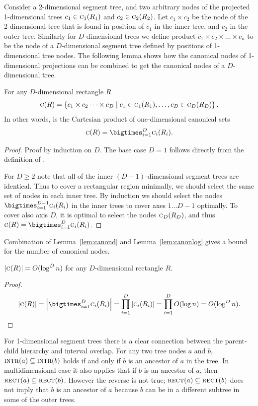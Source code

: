 \documentclass[english,gradu]{tktltiki2018}
\begin{document}
Consider a 2-dimensional segment tree, and two arbitrary nodes of the projected 1-dimensional trees $c_1\in\canoni{R_1}{1}$ and $c_2\in\canoni{R_2}{2}$.
Let $c_1\times c_2$ be the node of the 2-dimensional tree that is found in position of $c_1$ in the inner tree, and $c_2$ in the outer tree.
Similarly for $D$-dimensional trees we define product $c_1\times c_2\times\dots\times c_n$ to be the node of a $D$-dimensional segment tree defined by positions of 1-dimensional tree nodes.
The following lemma shows how the canonical nodes of 1-dimensional projections can be combined to get the canonical nodes of a $D$-dimensional tree.

\begin{lem}\label{lem:canond}
For any $D$-dimensional rectangle $R$
$$\canon{R}=\set{c_1\times c_2\dots\times c_D \mid c_1\in\canoni{R_1}{1}, \dots, c_D\in\canoni{R_D}{D}}.$$
In other words,  is the Cartesian product of one-dimensional canonical sets
$$\canon{R}=\bigtimes_{i=1}^D \canoni{R_i}{i}.$$
\end{lem}
\begin{proof}
Proof by induction on $D$.
The base case $D=1$ follows directly from the definition of .

For $D\ge 2$ note that all of the inner $(D-1)$-dimensional segment trees are identical.
Thus to cover a rectangular region minimally, we should select the same set of nodes in each inner tree.
By induction we should select the nodes $\bigtimes_{i=1}^{D-1} \canoni{R_i}{i}$ in the inner trees to cover axes $1\dots D-1$ optimally.
To cover also axis $D$, it is optimal to select the nodes $\canoni{R_D}{D}$, and thus $\canon{R}=\bigtimes_{i=1}^D\canoni{R_i}{i}$.
\end{proof}

Combination of Lemma~\ref{lem:canond} and Lemma~\ref{lem:canonlog} gives a bound for the number of canonical nodes.

\begin{cor}\label{cor:canondcount}$\size{\canon{R}}=O(\log^D\segsize)$ for any $D$-dimensional rectangle $R$.\end{cor}
\begin{proof}
$$
\size{\canon{R}} = \size{\bigtimes_{i=1}^D \canoni{R_i}{i}}
= \prod_{i=1}^D \size{\canoni{R_i}{i}}
= \prod_{i=1}^D O(\log\segsize)
= O(\log^D\segsize).
$$
\end{proof}

For 1-dimensional segment trees there is a clear connection between the parent-child hierarchy and interval overlap.
For any two tree nodes $a$ and $b$, $\inter{a}\subseteq\inter{b}$ holds if and only if $b$ is an ancestor of $a$ in the tree.
In multidimensional case it also applies that if $b$ is an ancestor of $a$, then $\rect{a}\subseteq\rect{b}$.
However the reverse is not true; $\rect{a}\subseteq\rect{b}$ does not imply that $b$ is an ancestor of $a$ because $b$ can be in a different subtree in some of the outer trees.
\end{document}
